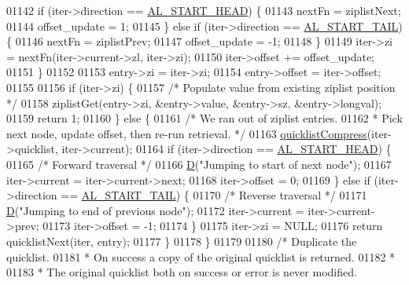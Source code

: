 \begin{DoxyCode}
{{{{{{{{01142         \textcolor{keywordflow}{if} (iter->direction == \hyperlink{adlist_8h_a353f032fdd7e66abe9f194fa7c89560b}{AL\_START\_HEAD}) \{
01143             nextFn = ziplistNext;
01144             offset\_update = 1;
01145         \} \textcolor{keywordflow}{else} \textcolor{keywordflow}{if} (iter->direction == \hyperlink{adlist_8h_a7d37e2046bb8d302b8ca5de4883a1c7f}{AL\_START\_TAIL}) \{
01146             nextFn = ziplistPrev;
01147             offset\_update = -1;
01148         \}
01149         iter->zi = nextFn(iter->current->zl, iter->zi);
01150         iter->offset += offset\_update;
01151     \}
01152 
01153     entry->zi = iter->zi;
01154     entry->offset = iter->offset;
01155 
01156     \textcolor{keywordflow}{if} (iter->zi) \{
01157         \textcolor{comment}{/* Populate value from existing ziplist position */}
01158         ziplistGet(entry->zi, &entry->value, &entry->sz, &entry->longval);
01159         \textcolor{keywordflow}{return} 1;
01160     \} \textcolor{keywordflow}{else} \{
01161         \textcolor{comment}{/* We ran out of ziplist entries.}
01162 \textcolor{comment}{         * Pick next node, update offset, then re-run retrieval. */}
01163         \hyperlink{quicklist_8c_a4711a946d258d25f4bedace1458a2a1c}{quicklistCompress}(iter->quicklist, iter->current);
01164         \textcolor{keywordflow}{if} (iter->direction == \hyperlink{adlist_8h_a353f032fdd7e66abe9f194fa7c89560b}{AL\_START\_HEAD}) \{
01165             \textcolor{comment}{/* Forward traversal */}
01166             \hyperlink{debugmacro_8h_a74021f021dcdfbb22891787b79c5529d}{D}(\textcolor{stringliteral}{"Jumping to start of next node"});
01167             iter->current = iter->current->next;
01168             iter->offset = 0;
01169         \} \textcolor{keywordflow}{else} \textcolor{keywordflow}{if} (iter->direction == \hyperlink{adlist_8h_a7d37e2046bb8d302b8ca5de4883a1c7f}{AL\_START\_TAIL}) \{
01170             \textcolor{comment}{/* Reverse traversal */}
01171             \hyperlink{debugmacro_8h_a74021f021dcdfbb22891787b79c5529d}{D}(\textcolor{stringliteral}{"Jumping to end of previous node"});
01172             iter->current = iter->current->prev;
01173             iter->offset = -1;
01174         \}
01175         iter->zi = NULL;
01176         \textcolor{keywordflow}{return} quicklistNext(iter, entry);
01177     \}
01178 \}
01179 
01180 \textcolor{comment}{/* Duplicate the quicklist.}
01181 \textcolor{comment}{ * On success a copy of the original quicklist is returned.}
01182 \textcolor{comment}{ *}
01183 \textcolor{comment}{ * The original quicklist both on success or error is never modified.}
}}}}}}}}
\end{DoxyCode}
